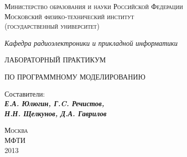 
\thispagestyle{empty}

\begin{center}
\small
\textsc{Министерство образования и науки Российской Федерации \\
    Московский физико-технический институт \\
    (государственный университет) \\
}
\end{center}

\begin{center}
\textit{Кафедра радиоэлектроники и прикладной информатики}
\end{center}

\vfill

\begin{center}
    \begin{LARGE}
    \textsc{ЛАБОРАТОРНЫЙ ПРАКТИКУМ \\}
    \end{LARGE}
    \medskip
    \begin{Large}
    \textsc{ПО ПРОГРАММНОМУ МОДЕЛИРОВАНИЮ}
    \end{Large}
\end{center}

\vfill

\begin{center}
\begin{large}
Составители: \\
\textit{\textbf{Е.А. Юлюгин, Г.C. Речистов, \\
    Н.Н. Щелкунов, Д.А. Гаврилов}}
\end{large}
\end{center}

\vfill

\begin{center}
    \textsc{Москва}\\
    \textsc{МФТИ}\\
    2013
\end{center}
